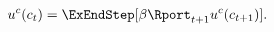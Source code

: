   \begin{equation}\begin{gathered}\begin{aligned}
        \uFunc^{{c}}({c}_{t})  & = \ExEndStep[\DiscFac {\Rport}_{t+1} \uFunc^{{c}}({c}_{t+1})]. \label{eq:EulercRiskyR}
      \end{aligned}\end{gathered}\end{equation}
